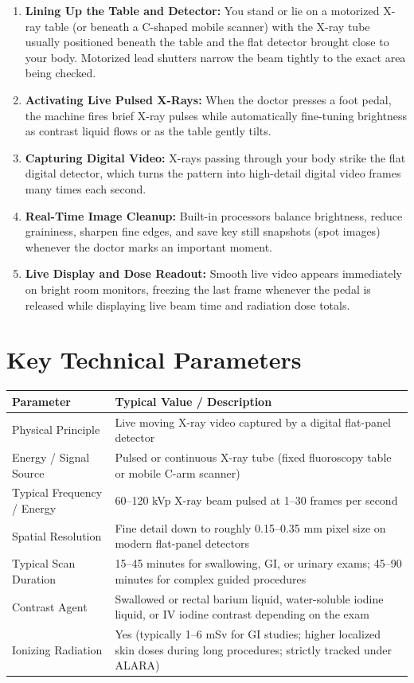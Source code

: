 \begin{enumerate}
    \item \textbf{Lining Up the Table and Detector:} You stand or lie on a motorized X-ray table (or beneath a C-shaped mobile scanner) with the X-ray tube usually positioned beneath the table and the flat detector brought close to your body. Motorized lead shutters narrow the beam tightly to the exact area being checked.
    \item \textbf{Activating Live Pulsed X-Rays:} When the doctor presses a foot pedal, the machine fires brief X-ray pulses while automatically fine-tuning brightness as contrast liquid flows or as the table gently tilts.
    \item \textbf{Capturing Digital Video:} X-rays passing through your body strike the flat digital detector, which turns the pattern into high-detail digital video frames many times each second.
    \item \textbf{Real-Time Image Cleanup:} Built-in processors balance brightness, reduce graininess, sharpen fine edges, and save key still snapshots (spot images) whenever the doctor marks an important moment.
    \item \textbf{Live Display and Dose Readout:} Smooth live video appears immediately on bright room monitors, freezing the last frame whenever the pedal is released while displaying live beam time and radiation dose totals.
\end{enumerate}

\section{Key Technical Parameters}

\noindent\begin{tabularx}{\textwidth}{@{}l X@{}}
\toprule
\textbf{Parameter} & \textbf{Typical Value / Description} \\
\midrule
Physical Principle & Live moving X-ray video captured by a digital flat-panel detector \\
Energy / Signal Source & Pulsed or continuous X-ray tube (fixed fluoroscopy table or mobile C-arm scanner) \\
Typical Frequency / Energy & 60--120 kVp X-ray beam pulsed at 1--30 frames per second \\
Spatial Resolution & Fine detail down to roughly 0.15--0.35 mm pixel size on modern flat-panel detectors \\
Typical Scan Duration & 15--45 minutes for swallowing, GI, or urinary exams; 45--90 minutes for complex guided procedures \\
Contrast Agent & Swallowed or rectal barium liquid, water-soluble iodine liquid, or IV iodine contrast depending on the exam \\
Ionizing Radiation & Yes (typically 1--6 mSv for GI studies; higher localized skin doses during long procedures; strictly tracked under ALARA) \\
\bottomrule
\end{tabularx}

